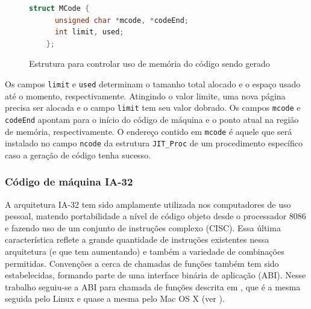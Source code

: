 \begin{figure}[h]
  \centering
  \begin{lstlisting}[language=C]
    struct MCode {
      unsigned char *mcode, *codeEnd;
      int limit, used;
    };
  \end{lstlisting}
  \caption{Estrutura para controlar uso de memória do código sendo gerado\label{mcode-struct}}
\end{figure}

Os campos \verb!limit! e \verb!used! determinam o tamanho total
alocado e o espaço usado até o momento, respectivamente. Atingindo o
valor limite, uma nova página precisa ser alocada e o campo
\verb!limit! tem seu valor dobrado. Os campos \verb!mcode! e
\verb!codeEnd! apontam para o início do código de máquina e o
ponto atual na região de memória, respectivamente. O endereço contido em
\verb!mcode! é aquele que será instalado no campo
\verb!ncode! da estrutura \verb!JIT_Proc! de um procedimento
específico caso a geração de código tenha sucesso.

\subsubsection{Código de máquina IA-32}

A arquitetura IA-32 tem sido amplamente utilizada nos computadores de
uso pessoal, matendo portabilidade a nível de código objeto desde o
processador 8086 e fazendo uso de um conjunto de instruções complexo (CISC).
Essa última característica reflete a grande quantidade de instruções
existentes nessa arquitetura (e que tem aumentando) e também a
variedade de combinações permitidas. Convenções a cerca de chamadas de
funções também tem sido estabelecidas, formando parte de uma interface
binária de aplicação (ABI). Nesse trabalho seguiu-se a ABI para
chamada de funções descrita em , que é a mesma
seguida pelo Linux e quase a mesma pelo Mac OS X (ver ).


